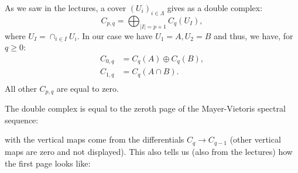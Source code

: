 \documentclass{article}
\begin{document}
As we saw in the lectures, a cover $(U_i)_{i \in \Lambda}$ gives as a double complex:
\begin{equation*}
C_{p,q} = \bigoplus_{|I| = p+1} C_q (U_I),
\end{equation*}
where $U_I = \cap_{i \in I} U_i$. In our case we have $U_1 = A, U_2 = B$ and thus, we have, for $q \geq 0$:
\begin{align*}
C_{0,q} &= C_q(A) \oplus C_q(B), \\
C_{1,q} &= C_q(A \cap B). \\
\end{align*}
All other $C_{p,q}$ are equal to zero.

The double complex is equal to the zeroth page of the Mayer-Vietoris spectral sequence:

\begin{center}\end{center}

with the vertical maps come from the differentials $C_q \to C_{q-1}$ (other vertical maps are zero and not displayed).
This also tells us (also from the lectures) how the first page looks like:

\begin{center}\end{center}
\end{document}
